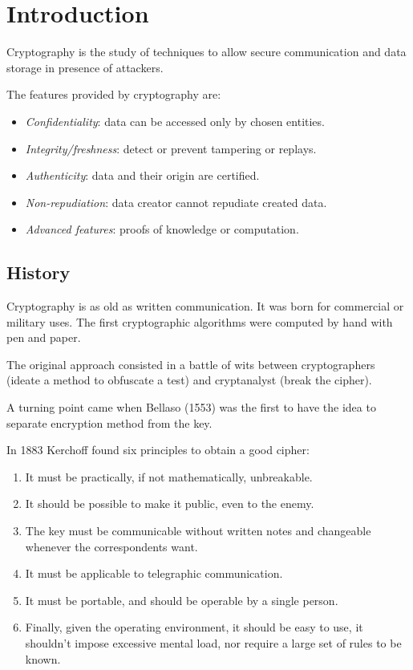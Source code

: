\section{Introduction}

\begin{definition}
    Cryptography is the study of techniques to allow secure communication and data storage in presence of attackers.     
\end{definition}
The features provided by cryptography are: 
\begin{itemize}
    \item \textit{Confidentiality}: data can be accessed only by chosen entities. 
    \item \textit{Integrity/freshness}: detect or prevent tampering or replays. 
    \item \textit{Authenticity}: data and their origin are certified. 
    \item \textit{Non-repudiation}: data creator cannot repudiate created data. 
    \item \textit{Advanced features}: proofs of knowledge or computation. 
\end{itemize}

\subsection{History}
Cryptography is as old as written communication. 
It was born for commercial or military uses. 
The first cryptographic algorithms were computed by hand with pen and paper. 

The original approach consisted in a battle of wits between cryptographers (ideate a method to obfuscate a test) and cryptanalyst (break the cipher). 

A turning point came when Bellaso (1553) was the first to have the idea to separate encryption method from the key. 

In 1883 Kerchoff found six principles to obtain a good cipher: 
\begin{enumerate}
    \item It must be practically, if not mathematically, unbreakable. 
    \item It should be possible to make it public, even to the enemy. 
    \item The key must be communicable without written notes and changeable whenever the correspondents want. 
    \item It must be applicable to telegraphic communication. 
    \item It must be portable, and should be operable by a single person. 
    \item Finally, given the operating environment, it should be easy to use, it shouldn't impose excessive mental load, nor require a large set of rules to be known. 
\end{enumerate}

